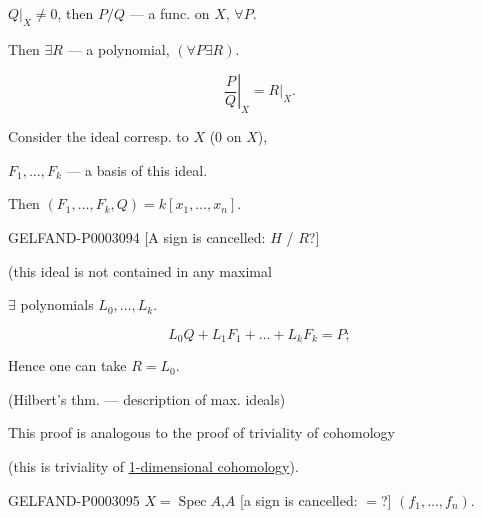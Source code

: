 $Q|_X\ne0$, then $P/Q$ --- a func. on $X$, $\forall P$.





Then $\exists R$ --- a polynomial, $(\forall P\exists R)$.

\begin{equation*}\left.\frac P Q\right|_X=R|_X.\end{equation*}

Consider the ideal corresp. to $X$ (0 on $X$),

$F_1,\ldots, F_k$ --- a basis of this ideal.

Then $(F_1,\ldots, F_k, Q)=k[x_1,\ldots, x_n]$.





\begin{GelfandAdjacentEvidence}{GELFAND-P000309}{4}
[A sign is cancelled: $H$ / $R$?]

\end{GelfandAdjacentEvidence}


(this ideal is not contained in any maximal

$\exists$ polynomials $L_0,\ldots, L_k$.

\begin{equation*}L_0Q+L_1F_1+\ldots+L_kF_k=P;\end{equation*}





Hence one can take $R=L_0$.

(Hilbert’s thm. --- description of max. ideals)

This proof is analogous to the proof of triviality of cohomology

(this is triviality of \underline{1-dimensional cohomology}).

\begin{GelfandAdjacentEvidence}{GELFAND-P000309}{5}
$X=\operatorname{Spec}A$,\quad $A$ [a sign is cancelled: $=$?] $(f_1,\ldots, f_n)$.

\end{GelfandAdjacentEvidence}


